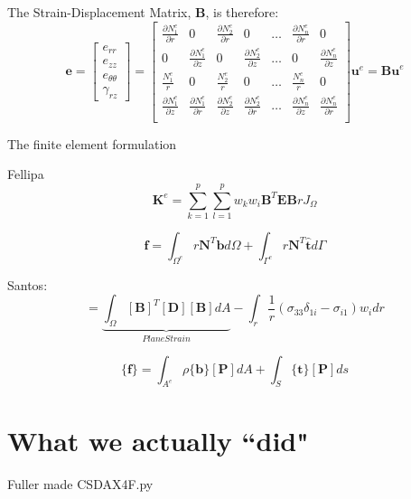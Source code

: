 \documentclass[10pt,letterpaper]{report}
\numberwithin{equation}{chapter}
\begin{document}
The Strain-Displacement Matrix, $\boldsymbol{B}$, is therefore:
\[
\boldsymbol{e} =
\left[ \begin{array}{c} e_{rr} \\ e_{zz} \\ e_{\theta \theta} \\ \gamma_{rz} \end{array} \right] = 
\left[  \begin{array}{ccccccc}
\frac{\partial N^e_1}{\partial r} & 0 & \frac{\partial N^e_2}{\partial r} & 0 & \dots & \frac{\partial N^e_n}{\partial r} & 0 \\
0 & \frac{\partial N^e_1}{\partial z} & 0 & \frac{\partial N^e_2}{\partial z} & \dots & 0 & \frac{\partial N^e_n}{\partial z} \\
\frac{ N^e_1}{ r} & 0 & \frac{ N^e_2}{ r} & 0 & \dots & \frac{ N^e_n}{ r} & 0 \\
\frac{\partial N^e_1}{\partial z} & \frac{\partial N^e_1}{\partial r} & \frac{\partial N^e_2}{\partial z} & \frac{\partial N^e_2}{\partial r} & \dots & \frac{\partial N^e_n}{\partial z} &\frac{\partial N^e_n}{\partial r} \\
\end{array} \right] 
\boldsymbol{u}^e = \boldsymbol{Bu}^e
\]




The finite element formulation

Fellipa
\begin{equation}
\pmb{K}^e=\sum_{k=1}^p \sum_{l=1}^p w_k w_i \pmb{B}^T \pmb{E} \pmb{B} r J_\Omega
\end{equation}

\begin{equation}
\pmb{f}=\int_{\Omega^e} r \pmb{N}^T \pmb{b} d\Omega +\int_{\Gamma^e} r \pmb{N}^T \pmb{\hat{t}} d\Gamma
\end{equation}

Santos:
\begin{equation}
[\pmb{K}^e]=\underbrace{\int_{\Omega} [\pmb{B}]^T [\pmb{D}] [\pmb{B}] dA}_{Plane Strain} -\int_r \frac{1}{r} (\sigma_{33} \delta_{1i}-\sigma_{i 1}) w_i dr
\end{equation}

\begin{equation}
\{\pmb{f}\}=\int_{A^e} \rho \{ \pmb{b}\} [\pmb{P}] dA + \int_S \{\pmb{t}\} [\pmb{P}] ds
\end{equation}

\chapter{What we actually ``did"}
Fuller made CSDAX4F.py
\end{document}
